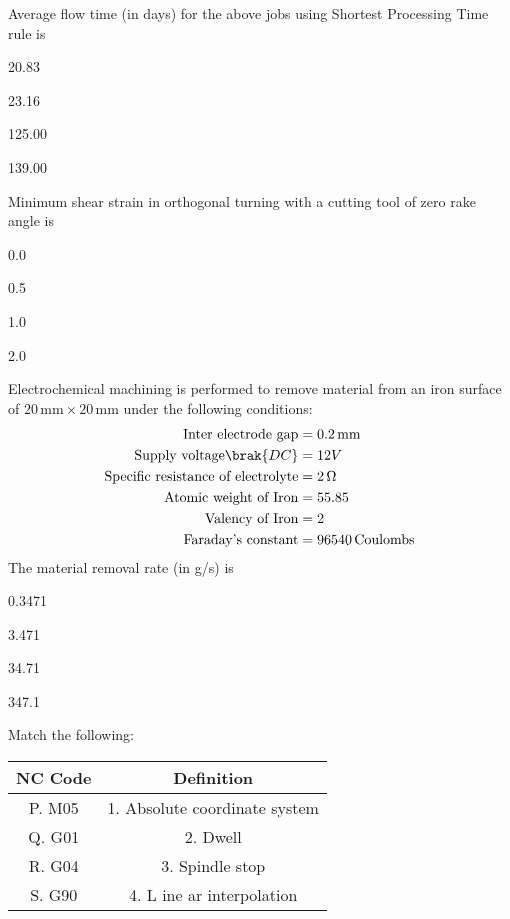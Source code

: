 Average flow time (in days) for the above jobs using Shortest Processing Time rule is 
\begin{enumerate}
\begin{multicols}{4}
\item 20.83
\item 23.16
\item 125.00
\item 139.00
\end{multicols}
\end{enumerate}
\item Minimum shear strain in orthogonal turning with a cutting tool of zero rake angle is  
\begin{enumerate}
\begin{multicols}{4}
\item 0.0
\item 0.5
\item 1.0
\item 2.0
\end{multicols}
\end{enumerate}
\item Electrochemical machining is performed to remove material from an iron surface of $20 \, \text{mm} \times 20 \, \text{mm}$ under the following conditions:
	\begin{align*}
		\text{Inter electrode gap} &= 0.2 \, \text{mm} \\
		\text{Supply voltage} \brak{DC} & =12V \\
		\text{Specific resistance of electrolyte} &= 2 \, \Omega \\
		\text{Atomic weight of Iron} &= 55.85 \\
		\text{Valency of Iron} &=2 \\
		\text{Faraday's constant} &= 96540 \,\text{Coulombs}
	\end{align*}
		The material removal rate (in g/s) is
\begin{enumerate}
\begin{multicols}{4}
\item 0.3471
\item 3.471
\item 34.71
\item 347.1
\end{multicols}
\end{enumerate}
\item Match the following:
\begin{table}[h!]
        \centering
  \begin{tabular}{|c|c|}                             
        \hline \textbf{NC Code} & \textbf{Definition}
 \\ \hline P. M05 & 1. Absolute coordinate system
 \\ \hline Q. G01 & 2. Dwell \\ \hline
     R. G04 & 3. Spindle stop \\ \hline S. G90 & 4. L
ine    ar interpolation \\ \hline                    

                    

\end{tabular}   

\end{table}	
	
